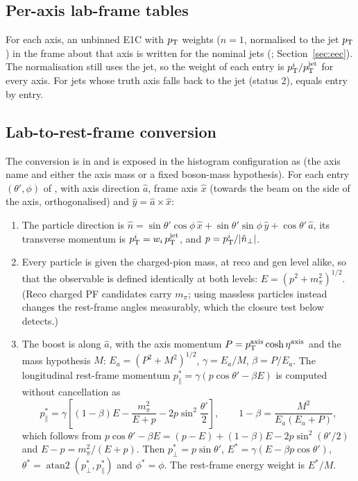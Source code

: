 \subsection{Per-axis lab-frame tables}
\label{app:axes:tables}
For each axis, an unbinned E1C with $p_{\mathrm{T}}$ weights ($n = 1$, normalised to the jet $p_{\mathrm{T}}$) in the  frame
about that axis is written for the nominal jets (; Section~\ref{sec:eec}). The normalisation still
uses the jet, so the weight of each entry is $p_{\mathrm{T}}^i/p_{\mathrm{T}}^{\mathrm{jet}}$ for every axis. For jets whose truth axis falls back to the
jet (status 2),  equals  entry by entry.

\subsection{Lab-to-rest-frame conversion}
\label{app:axes:boost}
The conversion is in  and is exposed in the histogram configuration as
 (the axis name and either the axis mass or a fixed boson-mass hypothesis). For each
entry $(\theta', \phi)$ of , with axis direction $\hat a$, frame axis $\hat x$ (towards the beam on
the side of the axis, orthogonalised) and $\hat y = \hat a\times\hat x$:
\begin{enumerate}
\item The particle direction is $\hat n = \sin\theta'\cos\phi\,\hat x + \sin\theta'\sin\phi\,\hat y + \cos\theta'\,\hat a$,
  its transverse momentum is $p_{\mathrm{T}}^i = w_i\,p_{\mathrm{T}}^{\mathrm{jet}}$, and $p = p_{\mathrm{T}}^i/|\hat n_\perp|$.
\item Every particle is given the charged-pion mass, at reco and gen level alike, so that the observable is defined
  identically at both levels: $E = (p^2 + m_\pi^2)^{1/2}$. (Reco charged PF candidates carry $m_\pi$; using massless
  particles instead changes the rest-frame angles measurably, which the closure test below detects.)
\item The boost is along $\hat a$, with the axis momentum $P = p_{\mathrm{T}}^\mathrm{axis}\cosh\eta^\mathrm{axis}$ and the mass
  hypothesis $M$: $E_a = (P^2+M^2)^{1/2}$, $\gamma = E_a/M$, $\beta = P/E_a$. The longitudinal rest-frame momentum
  $p^*_\parallel = \gamma(p\cos\theta' - \beta E)$ is computed without cancellation as
  \begin{equation}
    p^*_\parallel = \gamma\left[(1-\beta)E - \frac{m_\pi^2}{E + p} - 2p\sin^2\frac{\theta'}{2}\right],
    \qquad 1 - \beta = \frac{M^2}{E_a(E_a + P)},
  \end{equation}
  which follows from $p\cos\theta' - \beta E = (p - E) + (1-\beta)E - 2p\sin^2(\theta'/2)$ and $E - p = m_\pi^2/(E+p)$.
  Then $p^*_\perp = p\sin\theta'$, $E^* = \gamma(E - \beta p\cos\theta')$, $\theta^* = \operatorname{atan2}(p^*_\perp,
  p^*_\parallel)$ and $\phi^* = \phi$. The rest-frame energy weight is $E^*/M$.
\end{enumerate}
